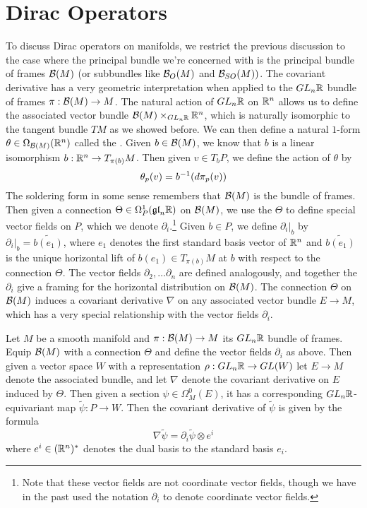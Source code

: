%
\section{Dirac Operators}
%
To discuss Dirac operators on manifolds, we restrict the previous discussion
to the case where the principal bundle we're concerned with is the principal
bundle of frames $\mathcal{B}(M)$ (or subbundles like $\mathcal{B}_O(M)$ and $\mathcal{B}_{SO}(M))$.
The covariant derivative has a very geometric interpretation
when applied to the $GL_n\mathbb{R}$ bundle of frames $\pi : \mathcal{B}(M) \to M$.
The natural action of $GL_n\mathbb{R}$ on $\mathbb{R}^n$ allows us to
define the associated vector bundle $\mathcal{B}(M) \times_{GL_n\mathbb{R}} \mathbb{R}^n$, which is
naturally isomorphic to the tangent bundle $TM$ as we showed before. We can then
define a natural $1$-form $\theta \in \Omega_{\mathcal{B}(M)}(\mathbb{R}^n)$ called the
. Given $b \in \mathcal{B}(M)$, we know that $b$ is a linear
isomorphism $b : \mathbb{R}^n \to T_{\pi(b)}M$. Then given $v \in T_bP$, we
define the action of $\theta$ by
\[
\theta_p(v) = b^{-1}(d\pi_p(v))
\]
The soldering form in some sense remembers that $\mathcal{B}(M)$ is the bundle of
frames. Then given a connection $\Theta \in \Omega_P^1(\mathfrak{gl}_n\mathbb{R})$ on $\mathcal{B}(M)$,
we use the $\Theta$ to define special vector fields on $P$, which we
denote $\partial_i$.\footnote{Note that these vector fields are not coordinate
vector fields, though we have in the past used the notation $\partial_i$ to
denote coordinate vector fields.} Given $b \in P$, we define $\partial_i\vert_b$
by $\partial_i\vert_b = \widetilde{b(e_1)}$, where $e_1$ denotes the first
standard basis vector of $\mathbb{R}^n$ and $\widetilde{b(e_1)}$ is the unique horizontal
lift of $b(e_1) \in T_{\pi(b)}M$ at $b$ with respect to the connection $\Theta$.
The vector fields $\partial_2, \ldots \partial_n$ are defined analogously,
and together the $\partial_i$ give a framing for the horizontal distribution on
$\mathcal{B}(M)$. The connection $\Theta$ on $\mathcal{B}(M)$ induces a covariant derivative $\nabla$
on any associated vector bundle $E \to M$, which has a very special relationship
with the vector fields $\partial_i$.
%
\begin{prop}
Let $M$ be a smooth manifold and $\pi : \mathcal{B}(M) \to M$ its $GL_n\mathbb{R}$ bundle
of frames. Equip $\mathcal{B}(M)$ with a connection $\Theta$ and define the vector fields
$\partial_i$ as above. Then given a vector space $W$ with a representation
$\rho : GL_n\mathbb{R} \to GL(W)$ let $E \to M$ denote the associated bundle, and
let $\nabla$ denote the covariant derivative on $E$ induced by $\Theta$. Then
given a section $\psi \in \Omega_M^0(E)$, it has a corresponding
$GL_n\mathbb{R}$-equivariant map $\tilde{\psi} : P \to W$. Then the covariant derivative
of $\tilde{\psi}$ is given by the formula
\[
\nabla\tilde{\psi} = \partial_i\tilde{\psi} \otimes e^i
\]
where $e^i \in (\mathbb{R}^n)^*$ denotes the dual basis to the standard basis $e_i$.
\end{prop}
